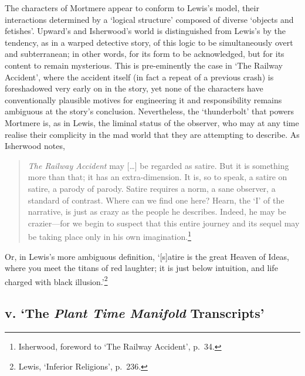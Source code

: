 \documentclass[]{article}
\begin{document}
The characters of Mortmere appear to conform to Lewis's model, their
interactions determined by a `logical structure' composed of diverse
`objects and fetishes'. Upward's and Isherwood's world is distinguished
from Lewis's by the tendency, as in a warped detective story, of this
logic to be simultaneously overt and subterranean; in other words, for
its form to be acknowledged, but for its content to remain mysterious.
This is pre-eminently the case in `The Railway Accident', where the
accident itself (in fact a repeat of a previous crash) is foreshadowed
very early on in the story, yet none of the characters have
conventionally plausible motives for engineering it and responsibility
remains ambiguous at the story's conclusion. Nevertheless, the
`thunderbolt' that powers Mortmere is, as in Lewis, the liminal status
of the observer, who may at any time realise their complicity in the mad
world that they are attempting to describe. As Isherwood notes,

\begin{quote}
\emph{The Railway Accident} may {[}\ldots{}{]} be regarded as satire.
But it is something more than that; it has an extra-dimension. It is, so
to speak, a satire on satire, a parody of parody. Satire requires a
norm, a sane observer, a standard of contrast. Where can we find one
here? Hearn, the `I' of the narrative, is just as crazy as the people he
describes. Indeed, he may be crazier---for we begin to suspect that this
entire journey and its sequel may be taking place only in his own
imagination.\footnote{Isherwood, foreword to `The Railway Accident',
  p.~34.}
\end{quote}

\noindent Or, in Lewis's more ambiguous definition, `{[}s{]}atire is the
great Heaven of Ideas, where you meet the titans of red laughter; it is
just below intuition, and life charged with black illusion.'\footnote{Lewis,
  `Inferior Religions', p.~236.}

\subsection{\texorpdfstring{v. `The \emph{Plant Time Manifold}
Transcripts'}{v. The Plant Time Manifold Transcripts}}\label{v.-the-plant-time-manifold-transcripts}
\end{document}
